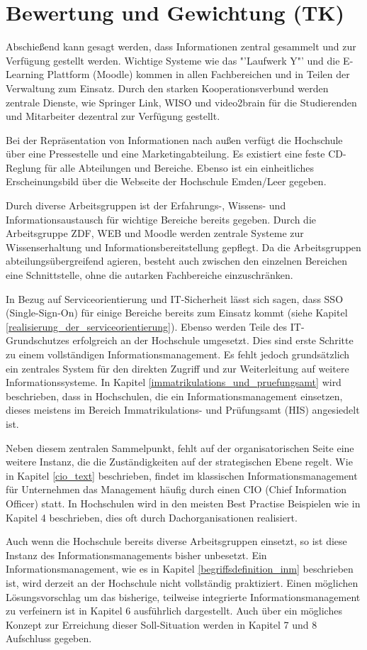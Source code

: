 \section{Bewertung und Gewichtung (TK)}
\label{section_bewertung_gewichtung}
Abschießend kann gesagt werden, dass Informationen zentral gesammelt und zur Verfügung gestellt werden. 
Wichtige Systeme wie das "'Laufwerk Y"' und die E-Learning Plattform (Moodle) kommen in allen 
Fachbereichen und in Teilen der Verwaltung zum Einsatz. Durch den starken Kooperationsverbund werden 
zentrale Dienste, wie Springer Link, WISO und video2brain für die Studierenden und Mitarbeiter dezentral zur 
Verfügung gestellt. 

Bei der Repräsentation von Informationen nach außen verfügt die Hochschule über eine Pressestelle und eine 
Marketingabteilung. Es existiert eine feste CD-Reglung für alle Abteilungen und Bereiche. Ebenso ist ein 
einheitliches Erscheinungsbild über die Webseite der Hochschule Emden/Leer gegeben.

Durch diverse Arbeitsgruppen ist der Erfahrungs-, Wissens- und Informationsaustausch für wichtige Bereiche 
bereits gegeben. Durch die Arbeitsgruppe ZDF, WEB und Moodle werden zentrale Systeme zur 
Wissenserhaltung und Informationsbereitstellung gepflegt. Da die Arbeitsgruppen abteilungsübergreifend 
agieren, besteht auch zwischen den einzelnen Bereichen eine Schnittstelle, ohne die autarken Fachbereiche 
einzuschränken. 

In Bezug auf Serviceorientierung und IT-Sicherheit lässt sich sagen, dass SSO (Single-Sign-On) für einige 
Bereiche bereits zum Einsatz kommt (siehe Kapitel \ref{realisierung_der_serviceorientierung}). Ebenso werden 
Teile des IT-Grundschutzes erfolgreich an der Hochschule umgesetzt. Dies sind erste Schritte zu einem 
vollständigen Informationsmanagement. Es fehlt jedoch grundsätzlich ein zentrales System für den direkten 
Zugriff und zur Weiterleitung auf weitere Informationssysteme. In Kapitel 
\ref{immatrikulations_und_pruefungsamt} wird beschrieben, dass in Hochschulen, die ein 
Informationsmanagement einsetzen, dieses meistens im Bereich Immatrikulations- und Prüfungsamt (HIS) 
angesiedelt ist. 

Neben diesem zentralen Sammelpunkt, fehlt auf der organisatorischen Seite eine weitere Instanz, die die 
Zuständigkeiten auf der strategischen Ebene regelt. Wie in Kapitel \ref{cio_text} beschrieben, findet im 
klassischen Informationsmanagement für Unternehmen das Management häufig durch einen CIO (Chief 
Information Officer) statt. In Hochschulen wird in den meisten Best Practise Beispielen wie in Kapitel 4 
beschrieben, dies oft durch Dachorganisationen realisiert.

Auch wenn die Hochschule bereits diverse Arbeitsgruppen einsetzt, so ist diese Instanz des 
Informationsmanagements bisher unbesetzt. Ein Informationsmanagement, wie es in Kapitel 
\ref{begriffsdefinition_inm} beschrieben ist, wird derzeit an der Hochschule nicht vollständig praktiziert. Einen 
möglichen Lösungsvorschlag um das bisherige, teilweise integrierte Informationsmanagement zu verfeinern 
ist in Kapitel 6 ausführlich dargestellt. Auch über ein mögliches Konzept zur Erreichung dieser Soll-Situation 
werden in Kapitel 7 und 8 Aufschluss gegeben.